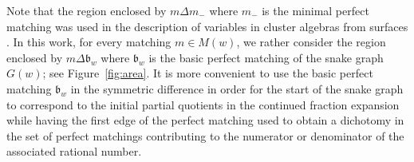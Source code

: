 \documentclass[a4paper,12pt]{amsart}
\newcommand{\bfrak}{{\mathfrak{b}}}
\newcommand{\0}{\mathtt{0}}
\newcommand{\1}{\mathtt{1}}
\newcommand{\2}{\mathtt{2}}
\newcommand{\3}{\mathtt{3}}
\begin{document}
Note that the region enclosed by $m\Delta m_-$
where $m_-$ is the minimal perfect matching was used
in the description of variables in cluster algebras from surfaces
\cite{MR2661414,MR3034481,zbMATH06144657}.
In this work, for every matching $m\in M(w)$, we rather consider the region
enclosed by $m\Delta\bfrak_w$ where $\bfrak_w$ is the basic perfect matching of
the snake graph $G(w)$; see Figure~\ref{fig:area}.
It is more convenient to use the basic perfect matching $\bfrak_w$
in the symmetric difference in order for the start of the snake graph
to correspond to the initial partial quotients in the continued fraction expansion
while having the first edge of the perfect matching used to obtain a dichotomy
in the set of perfect matchings contributing to the numerator or denominator
of the associated rational number.
\end{document}
